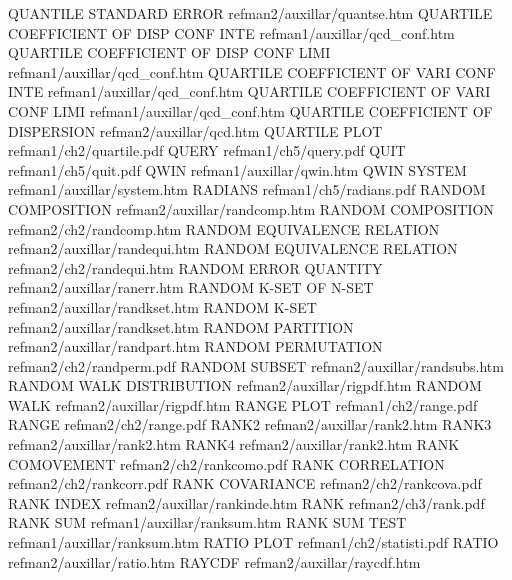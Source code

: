 QUANTILE STANDARD ERROR                 refman2/auxillar/quantse.htm
QUARTILE COEFFICIENT OF DISP CONF INTE  refman1/auxillar/qcd_conf.htm
QUARTILE COEFFICIENT OF DISP CONF LIMI  refman1/auxillar/qcd_conf.htm
QUARTILE COEFFICIENT OF VARI CONF INTE  refman1/auxillar/qcd_conf.htm
QUARTILE COEFFICIENT OF VARI CONF LIMI  refman1/auxillar/qcd_conf.htm
QUARTILE COEFFICIENT OF DISPERSION      refman2/auxillar/qcd.htm
QUARTILE PLOT                           refman1/ch2/quartile.pdf
QUERY                                   refman1/ch5/query.pdf
QUIT                                    refman1/ch5/quit.pdf
QWIN                                    refman1/auxillar/qwin.htm
QWIN SYSTEM                             refman1/auxillar/system.htm
RADIANS                                 refman1/ch5/radians.pdf
RANDOM COMPOSITION                      refman2/auxillar/randcomp.htm
RANDOM COMPOSITION                      refman2/ch2/randcomp.htm
RANDOM EQUIVALENCE RELATION             refman2/auxillar/randequi.htm
RANDOM EQUIVALENCE RELATION             refman2/ch2/randequi.htm
RANDOM ERROR QUANTITY                   refman2/auxillar/ranerr.htm
RANDOM K-SET OF N-SET                   refman2/auxillar/randkset.htm
RANDOM K-SET                            refman2/auxillar/randkset.htm
RANDOM PARTITION                        refman2/auxillar/randpart.htm
RANDOM PERMUTATION                      refman2/ch2/randperm.pdf
RANDOM SUBSET                           refman2/auxillar/randsubs.htm
RANDOM WALK DISTRIBUTION                refman2/auxillar/rigpdf.htm
RANDOM WALK                             refman2/auxillar/rigpdf.htm
RANGE PLOT                              refman1/ch2/range.pdf
RANGE                                   refman2/ch2/range.pdf
RANK2                                   refman2/auxillar/rank2.htm
RANK3                                   refman2/auxillar/rank2.htm
RANK4                                   refman2/auxillar/rank2.htm
RANK COMOVEMENT                         refman2/ch2/rankcomo.pdf
RANK CORRELATION                        refman2/ch2/rankcorr.pdf
RANK COVARIANCE                         refman2/ch2/rankcova.pdf
RANK INDEX                              refman2/auxillar/rankinde.htm
RANK                                    refman2/ch3/rank.pdf
RANK SUM                                refman1/auxillar/ranksum.htm
RANK SUM TEST                           refman1/auxillar/ranksum.htm
RATIO PLOT                              refman1/ch2/statisti.pdf
RATIO                                   refman2/auxillar/ratio.htm
RAYCDF                                  refman2/auxillar/raycdf.htm
